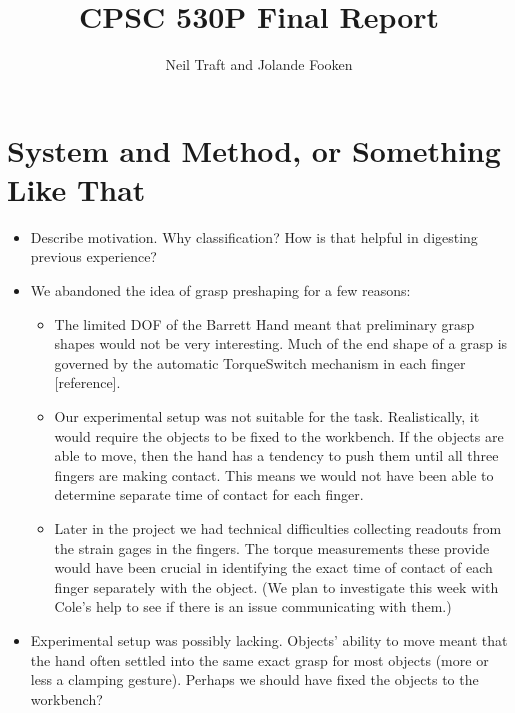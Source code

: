 \documentclass[12pt, oneside]{article}
\title{CPSC 530P Final Report}
\author{Neil Traft and Jolande Fooken}
\date{}
\begin{document}
\section{System and Method, or Something Like That}

\begin{itemize}
\item Describe motivation. Why classification? How is that helpful in digesting previous experience?
\item We abandoned the idea of grasp preshaping for a few reasons:
\begin{itemize}
\item The limited DOF of the Barrett Hand meant that preliminary grasp shapes would not be very interesting. Much of the end shape of a grasp is governed by the automatic TorqueSwitch\texttrademark\; mechanism in each finger [reference].
\item Our experimental setup was not suitable for the task. Realistically, it would require the objects to be fixed to the workbench. If the objects are able to move, then the hand has a tendency to push them until all three fingers are making contact. This means we would not have been able to determine separate time of contact for each finger.
\item Later in the project we had technical difficulties collecting readouts from the strain gages in the fingers. The torque measurements these provide would have been crucial in identifying the exact time of contact of each finger separately with the object. (We plan to investigate this week with Cole's help to see if there is an issue communicating with them.)
\end{itemize}
\item Experimental setup was possibly lacking. Objects' ability to move meant that the hand often settled into the same exact grasp for most objects (more or less a clamping gesture). Perhaps we should have fixed the objects to the workbench?
\end{itemize}
\end{document}

